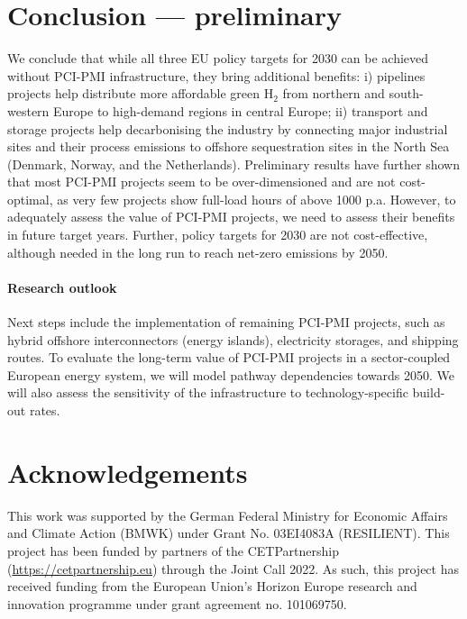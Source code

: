 \documentclass[final,5p,times,twocolumn]{elsarticle}
\begin{document}
\section{Conclusion --- preliminary}
\label{sec:conclusion}
We conclude that while all three EU policy targets for 2030 can be achieved without PCI-PMI infrastructure, they bring additional benefits: i)  pipelines projects help distribute more affordable green H$_2$ from northern and south-western Europe to high-demand regions in central Europe; ii)  transport and storage projects help decarbonising the industry by connecting major industrial sites and their process emissions to offshore sequestration sites in the North Sea (Denmark, Norway, and the Netherlands). Preliminary results have further shown that most PCI-PMI projects seem to be over-dimensioned and are not cost-optimal, as very few projects show full-load hours of above \SI{1000}{} p.a. However, to adequately assess the value of PCI-PMI projects, we need to assess their benefits in future target years. Further, policy targets for 2030 are not cost-effective, although needed in the long run to reach net-zero emissions by 2050.

\paragraph{Research outlook} Next steps include the implementation of remaining PCI-PMI projects, such as hybrid offshore interconnectors (energy islands), electricity storages, and  shipping routes. To evaluate the long-term value of PCI-PMI projects in a sector-coupled European energy system, we will model pathway dependencies towards 2050. We will also assess the sensitivity of the infrastructure to technology-specific build-out rates.

\section*{Acknowledgements}
This work was supported by the German Federal Ministry for Economic Affairs and Climate Action (BMWK) under Grant No. 03EI4083A (RESILIENT). This project has been funded by partners of the CETPartnership (\href{https://cetpartnership.eu}{https://cetpartnership.eu}) through the Joint Call 2022. As such, this project has received funding from the European Union's Horizon Europe research and innovation programme under grant agreement no. 101069750.

\appendix
\end{document}
